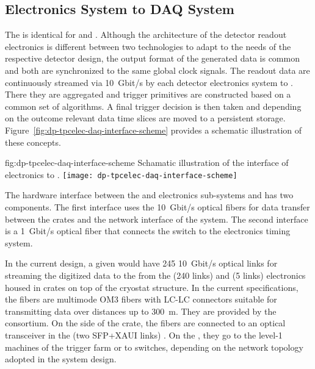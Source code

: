 \subsection{Electronics System to DAQ System}
\label{ssec:dp-tpcelec-intfc-daq}

The   is identical for  and . Although the architecture of the detector readout electronics is different between two technologies to adapt to the needs of the respective detector design, the output format of the generated data is common and both are synchronized to the same global clock signals. The readout data are continuously streamed via \SI{10}{Gbit/s} by each detector  electronics system to .  There they are aggregated and trigger primitives are constructed based on a common set of algorithms. A final trigger decision is then taken and depending on the outcome relevant data time slices are moved to a persistent storage. Figure~\ref{fig:dp-tpcelec-daq-interface-scheme} provides a schematic illustration of these concepts.
  
\begin{dunefigure}{fig:dp-tpcelec-daq-interface-scheme}
{Schamatic illustration of the interface of   electronics to .}
\texttt{[image: dp-tpcelec-daq-interface-scheme]}
\end{dunefigure}

The hardware interface between the \dual {} and  electronics sub-systems and  has two components. The first interface uses the \SI{10}{Gbit/s} optical fibers for data transfer between the  crates and the network interface of the  system. The second interface is a \SI{1}{Gbit/s} optical fiber that connects the   switch to the \dual electronics timing system.   

In the current design, a given  would have \num{245} \SI{10}{Gbit/s} optical links for streaming the digitized data to the  from the  (\num{240} links) and  (\num{5} links) electronics housed in  crates on top of the cryostat structure.  In the current specifications, the fibers are multimode OM3 fibers \cite{om3fibers} with LC-LC connectors suitable for transmitting data over distances up to \SI{300}{\metre}.  They are provided by the  consortium. On the side of the  crate, the fibers are connected to an optical transceiver in the  (two SFP+XAUI links) \cite{natmch}.  On the , they go to the level-1 machines of the trigger farm or to switches, depending on the network topology adopted in the  system design.

